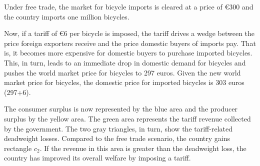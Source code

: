 Under free trade, the market for bicycle imports is cleared at a price of \euro 300 and the country imports one million bicycles. 

Now, if a tariff of \euro 6 per bicycle is imposed, the tariff drives a wedge between the price foreign exporters receive and the price domestic buyers of imports pay. That is, it becomes more expensive for domestic buyers to purchase imported bicycles. This, in turn, leads to an immediate drop in domestic demand for bicycles and pushes the world market price for bicycles to 297 euros. Given the new world market price for bicycles, the domestic price for imported bicycles is 303 euros (297+6).  

The consumer surplus is now represented by the blue area and the producer surplus by the yellow area. The green area represents the tariff revenue collected by the government. The two gray triangles, in turn, show the tariff-related deadweight losses. Compared to the free trade scenario, the country gains rectangle $c_2$. If the revenue in this area is greater than the deadweight loss, the country has improved its overall welfare by imposing a tariff. 

